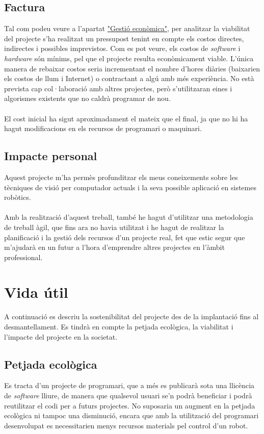 	\subsection{Factura}
		Tal com podeu veure a l'apartat \hyperref[sec:Costos]{"Gestió econòmica"}, per analitzar la viabilitat del projecte s'ha realitzat un pressupost tenint en compte els costos directes, indirectes
		i possibles imprevistos. Com es pot veure, els costos de \textit{software} i \textit{hardware} són mínims, pel que el projecte resulta econòmicament viable.
		L'única manera de rebaixar costos seria incrementant el nombre d'hores diàries (baixarien els costos de llum i Internet) o contractant a algú amb més experiència.
		No està prevista cap col·laboració amb altres projectes, però s'utilitzaran eines i algorismes existents que no caldrà programar de nou.\\\\
		El cost inicial ha sigut aproximadament el mateix que el final, ja que no hi ha hagut modificacions en els recursos de programari o maquinari.

	\subsection{Impacte personal}
		Aquest projecte m'ha permès profunditzar els meus coneixements sobre les tècniques de visió per computador actuals i la seva possible aplicació en sistemes robòtics.\\\\
		Amb la realització d'aquest treball, també he hagut d'utilitzar una metodologia de treball àgil, que fins ara no havia utilitzat i he hagut de realitzar la planificació i la gestió dels recursos
		d'un projecte real, fet que estic segur que m'ajudarà en un futur a l'hora d'emprendre altres projectes en l'àmbit professional.

\section{Vida útil}
	A continuació es descriu la sostenibilitat del projecte des de la implantació fins al desmantellament. Es tindrà en compte la petjada ecològica, la viabilitat i l'impacte del projecte en la societat.
	\subsection{Petjada ecològica}
		Es tracta d'un projecte de programari, que a més es publicarà sota una llicència de \textit{software} lliure, de manera que qualsevol usuari se'n podrà beneficiar i podrà reutilitzar el
		codi per a futurs projectes. No suposaria un augment en la petjada ecològica ni tampoc una disminució, encara que amb la utilització del programari desenvolupat es necessitarien menys recursos materials
		pel control d'un robot.

